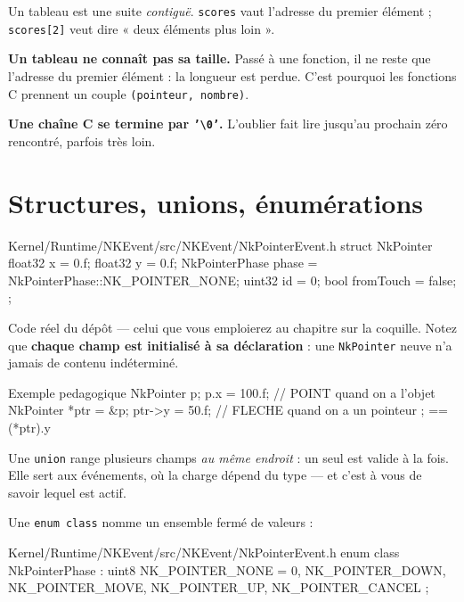 Un tableau est une suite \emph{contiguë}. \texttt{scores} vaut l'adresse du
premier élément ; \texttt{scores[2]} veut dire « deux éléments plus loin ».

\begin{nkpiege}
\textbf{Un tableau ne connaît pas sa taille.} Passé à une fonction, il ne reste
que l'adresse du premier élément : la longueur est perdue. C'est pourquoi les
fonctions C prennent un couple \texttt{(pointeur, nombre)}.

\textbf{Une chaîne C se termine par \texttt{'\textbackslash 0'}.} L'oublier fait
lire jusqu'au prochain zéro rencontré, parfois très loin.
\end{nkpiege}

\section{Structures, unions, énumérations}

\begin{nkcode}{Kernel/Runtime/NKEvent/src/NKEvent/NkPointerEvent.h}
struct NkPointer {
    float32 x = 0.f;
    float32 y = 0.f;
    NkPointerPhase phase = NkPointerPhase::NK_POINTER_NONE;
    uint32 id = 0;
    bool fromTouch = false;
};
\end{nkcode}

Code réel du dépôt --- celui que vous emploierez au chapitre sur la coquille.
Notez que \textbf{chaque champ est initialisé à sa déclaration} : une
\texttt{NkPointer} neuve n'a jamais de contenu indéterminé.

\begin{nkcode}{Exemple pedagogique}
NkPointer p;
p.x = 100.f;              // POINT quand on a l'objet
NkPointer *ptr = &p;
ptr->y = 50.f;            // FLECHE quand on a un pointeur ; == (*ptr).y
\end{nkcode}

Une \texttt{union} range plusieurs champs \emph{au même endroit} : un seul est
valide à la fois. Elle sert aux événements, où la charge dépend du type --- et
c'est à vous de savoir lequel est actif.

Une \texttt{enum class} nomme un ensemble fermé de valeurs :

\begin{nkcode}{Kernel/Runtime/NKEvent/src/NKEvent/NkPointerEvent.h}
enum class NkPointerPhase : uint8 {
    NK_POINTER_NONE = 0, NK_POINTER_DOWN, NK_POINTER_MOVE,
    NK_POINTER_UP,       NK_POINTER_CANCEL
};
\end{nkcode}

